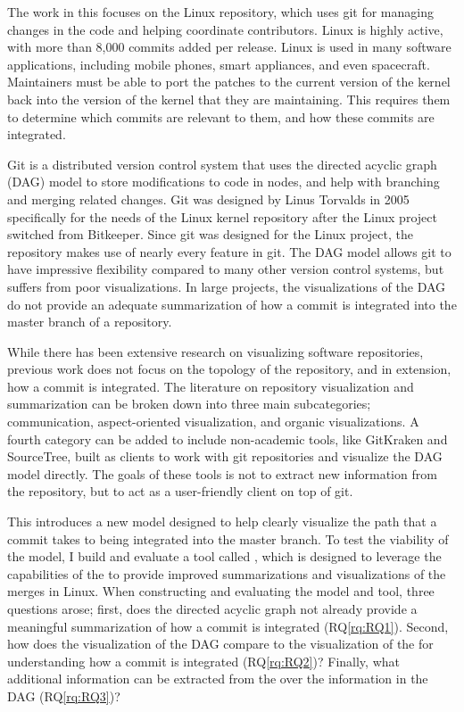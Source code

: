 The work in this \paper{} focuses on the Linux repository, which uses
git for managing changes in the code and helping coordinate
contributors. Linux is highly active, with more than 8,000 commits added
per release. Linux is used in many software applications, including
mobile phones, smart appliances, and even spacecraft. Maintainers must
be able to port the patches to the current version of the kernel back
into the version of the kernel that they are maintaining. This requires
them to determine which commits are relevant to them, and how these
commits are integrated.

Git is a distributed version control system that uses the directed
acyclic graph (DAG) model to store modifications to code in nodes, and
help with branching and merging related changes. Git was designed by
Linus Torvalds in 2005 specifically for the needs of the Linux kernel
repository after the Linux project switched from Bitkeeper. Since git
was designed for the Linux project, the repository makes use of nearly
every feature in git. The DAG model allows git to have impressive
flexibility compared to many other version control systems, but suffers
from poor visualizations. In large projects, the visualizations of the
DAG do not provide an adequate summarization of how a commit is
integrated into the master branch of a repository.

While there has been extensive research on visualizing software
repositories, previous work does not focus on the topology of the
repository, and in extension, how a commit is integrated. The literature
on repository visualization and summarization can be broken down into
three main subcategories; communication\cite{Cubranic2005,Begel2010},
aspect-oriented visualization\cite{Ambros2005,Burch2005,Ambros2009}, and
organic visualizations\cite{ogawa09,Caudwell2010}. A fourth category can
be added to include non-academic tools, like GitKraken and SourceTree,
built as clients to work with git repositories and visualize the DAG
model directly. The goals of these tools is not to extract new
information from the repository, but to act as a user-friendly client on
top of git.

This \paper{} introduces a new model designed to help clearly visualize
the path that a commit takes to being integrated into the master branch.
To test the viability of the model, I build and evaluate a tool called
\tool{}, which is designed to leverage the capabilities of the \mt{} to
provide improved summarizations and visualizations of the merges in
Linux. When constructing and evaluating the model and tool, three
questions arose; first, does the directed acyclic graph not already
provide a meaningful summarization of how a commit is integrated
(RQ\ref{rq:RQ1}). Second, how does the visualization of the DAG compare
to the visualization of the \mt{} for understanding how a commit is
integrated (RQ\ref{rq:RQ2})? Finally, what additional information can be
extracted from the \mt{} over the information in the DAG
(RQ\ref{rq:RQ3})?

